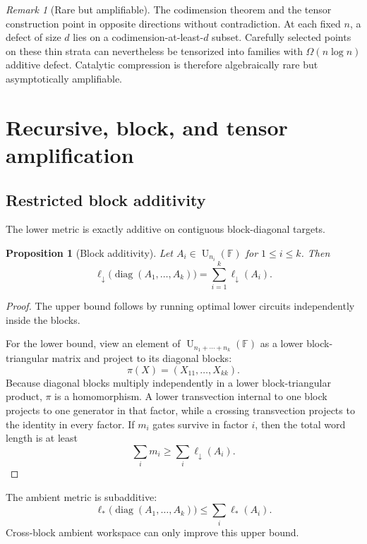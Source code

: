 \documentclass[11pt]{amsart}
\numberwithin{equation}{section}
\newtheorem{proposition}[theorem]{Proposition}
\theoremstyle{definition}
\theoremstyle{remark}
\newtheorem{remark}[theorem]{Remark}
\newcommand{\F}{\mathbb F}
\newcommand{\U}{\operatorname{U}}
\newcommand{\ellDown}{\ell_{\downarrow}}
\newcommand{\ellAll}{\ell_{*}}
\begin{document}
\begin{remark}[Rare but amplifiable]\label{rem:rare-amplifiable}
The codimension theorem and the tensor construction point in opposite directions without contradiction.  At each fixed $n$, a defect of size $d$ lies on a codimension-at-least-$d$ subset.  Carefully selected points on these thin strata can nevertheless be tensorized into families with $\Omega(n\log n)$ additive defect.  Catalytic compression is therefore algebraically rare but asymptotically amplifiable.
\end{remark}

\section{Recursive, block, and tensor amplification}\label{sec:amplification}

\subsection{Restricted block additivity}

The lower metric is exactly additive on contiguous block-diagonal targets.

\begin{proposition}[Block additivity]\label{prop:block-additivity}
Let $A_i\in\U_{n_i}(\F)$ for $1\le i\le k$.  Then
\[
\ellDown\bigl(\operatorname{diag}(A_1,\ldots,A_k)\bigr)
=
\sum_{i=1}^k\ellDown(A_i).
\]
\end{proposition}

\begin{proof}
The upper bound follows by running optimal lower circuits independently inside the blocks.

For the lower bound, view an element of $\U_{n_1+\cdots+n_k}(\F)$ as a lower block-triangular matrix and project to its diagonal blocks:
\[
\pi(X)=(X_{11},\ldots,X_{kk}).
\]
Because diagonal blocks multiply independently in a lower block-triangular product, $\pi$ is a homomorphism.  A lower transvection internal to one block projects to one generator in that factor, while a crossing transvection projects to the identity in every factor.  If $m_i$ gates survive in factor $i$, then the total word length is at least
\[
\sum_i m_i
\ge
\sum_i\ellDown(A_i).
\]
\end{proof}

The ambient metric is subadditive:
\[
\ellAll\bigl(\operatorname{diag}(A_1,\ldots,A_k)\bigr)
\le
\sum_i\ellAll(A_i).
\]
Cross-block ambient workspace can only improve this upper bound.
\end{document}
